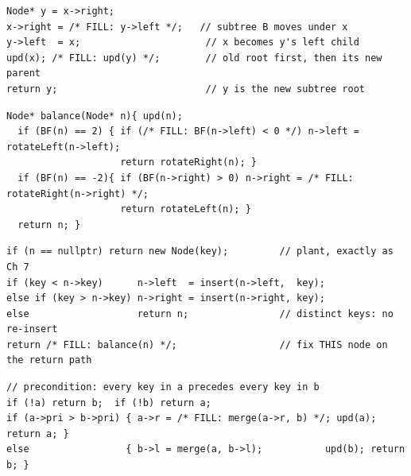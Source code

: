 \begin{lstlisting}[caption={Drill 1 -- the left rotation (from \coderef{c06-rotcode})}]
Node* y = x->right;
x->right = /* FILL: y->left */;   // subtree B moves under x
y->left  = x;                      // x becomes y's left child
upd(x); /* FILL: upd(y) */;        // old root first, then its new parent
return y;                          // y is the new subtree root
\end{lstlisting}

\begin{lstlisting}[caption={Drill 2 -- AVL four-case balance (from \coderef{c06-avlrot})}]
Node* balance(Node* n){ upd(n);
  if (BF(n) == 2) { if (/* FILL: BF(n->left) < 0 */) n->left = rotateLeft(n->left);
                    return rotateRight(n); }
  if (BF(n) == -2){ if (BF(n->right) > 0) n->right = /* FILL: rotateRight(n->right) */;
                    return rotateLeft(n); }
  return n; }
\end{lstlisting}

\begin{lstlisting}[caption={Drill 3 -- AVL insert (from \coderef{c06-avlins})}]
if (n == nullptr) return new Node(key);         // plant, exactly as Ch 7
if (key < n->key)      n->left  = insert(n->left,  key);
else if (key > n->key) n->right = insert(n->right, key);
else                   return n;                // distinct keys: no re-insert
return /* FILL: balance(n) */;                  // fix THIS node on the return path
\end{lstlisting}

\begin{lstlisting}[caption={Drill 4 -- treap merge (from \coderef{c06-treap})}]
// precondition: every key in a precedes every key in b
if (!a) return b;  if (!b) return a;
if (a->pri > b->pri) { a->r = /* FILL: merge(a->r, b) */; upd(a); return a; }
else                 { b->l = merge(a, b->l);           upd(b); return b; }
\end{lstlisting}

